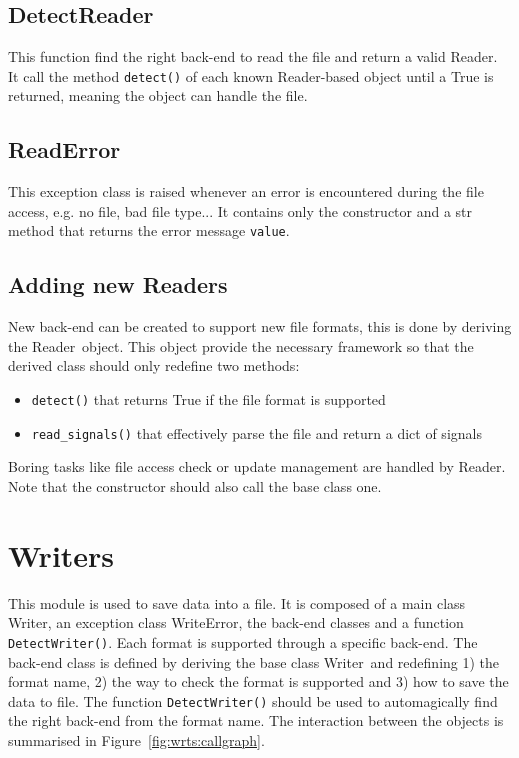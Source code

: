 \documentclass[a4paper,11pt]{article}
\newcommand{\att}[1]{\texttt{#1}}
\newcommand{\meth}[1]{\texttt{#1()}}
\newcommand{\cls}[1]{\textsf{#1}}
\newcommand{\rd}{\cls{Reader}}
\newcommand{\wrt}{\cls{Writer}}
\newcommand{\wrterr}{\cls{WriteError}}
\begin{document}
\subsection{DetectReader}
\label{sec:readers:detect}
This function find the right back-end to read the file and return a valid \rd.
It call the method \meth{detect} of each known \rd-based object until a True is returned, meaning the object can handle the file.

\subsection{ReadError}
\label{sec:readers:readerror}
This exception class is raised whenever an error is encountered during the file access, e.g. no file, bad file type...
It contains only the constructor and a str method that returns the error message \att{value}.

\subsection{Adding new Readers}
\label{sec:readers:add}
New back-end can be created to support new file formats, this is done by deriving the \rd\ object.
This object provide the necessary framework so that the derived class should only redefine two methods:
\begin{itemize}
\item \meth{detect} that returns True if the file format is supported
\item \meth{read\_signals} that effectively parse the file and return a dict of signals
\end{itemize}
Boring tasks like file access check or update management are handled by \rd.
Note that the constructor should also call the base class one.

\section{Writers}
\label{sec:writers}
This module is used to save data into a file.
It is composed of a main class \wrt, an exception class \wrterr, the back-end classes and a function \meth{DetectWriter}.
Each format is supported through a specific back-end.
The back-end class is defined by deriving the base class \wrt\ and redefining 1) the format name, 2) the way to check the format is supported and 3) how to save the data to file.
The function \meth{DetectWriter} should be used to automagically find the right back-end from the format name.
The interaction between the objects is summarised in Figure~\ref{fig:wrts:callgraph}.
\end{document}
